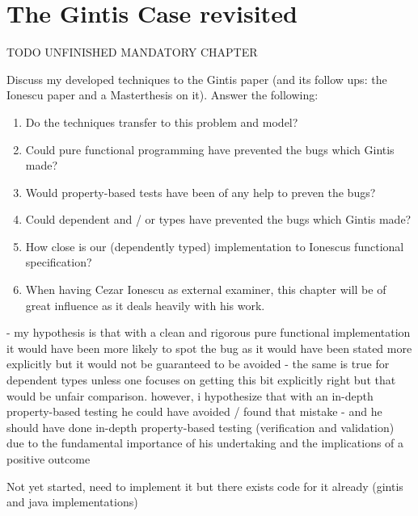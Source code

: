 \chapter{The Gintis Case revisited}
\label{ch:gintis_case}
TODO UNFINISHED MANDATORY CHAPTER

Discuss my developed techniques to the Gintis paper (and its follow ups: the Ionescu paper \cite{botta_functional_2011} and a Masterthesis \cite{evensen_extensible_2010} on it). Answer the following:

\begin{enumerate}
	\item Do the techniques transfer to this problem and model? 
	
	\item Could pure functional programming have prevented the bugs which Gintis made? 
	
	\item Would property-based tests have been of any help to preven the bugs?
	
	\item Could dependent and / or types have prevented the bugs which Gintis made? 
	
	\item How close is our (dependently typed) implementation to Ionescus functional specification? 
	
	\item When having Cezar Ionescu as external examiner, this chapter will be of great influence as it deals heavily with his work.

\end{enumerate}

- my hypothesis is that with a clean and rigorous pure functional implementation it would have been more likely to spot the bug as it would have been stated more explicitly but it would not be guaranteed to be avoided - the same is true for dependent types unless one focuses on getting this bit explicitly right but that would be unfair comparison. however, i hypothesize that with an in-depth property-based testing he could have avoided / found that mistake - and he should have done in-depth property-based testing (verification and validation) due to the fundamental importance of his undertaking and the implications of a positive outcome

Not yet started, need to implement it but there exists code for it already (gintis and java implementations)

%
%
%
%

